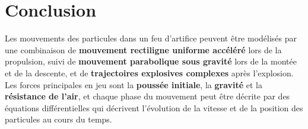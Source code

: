 \documentclass[12pt]{article}
\begin{document}
\section*{Conclusion}

Les mouvements des particules dans un feu d'artifice peuvent être modélisés par une combinaison de \textbf{mouvement rectiligne uniforme accéléré} lors de la propulsion, suivi de \textbf{mouvement parabolique sous gravité} lors de la montée et de la descente, et de \textbf{trajectoires explosives complexes} après l'explosion. Les forces principales en jeu sont la \textbf{poussée initiale}, la \textbf{gravité} et la \textbf{résistance de l'air}, et chaque phase du mouvement peut être décrite par des équations différentielles qui décrivent l'évolution de la vitesse et de la position des particules au cours du temps.
\end{document}
